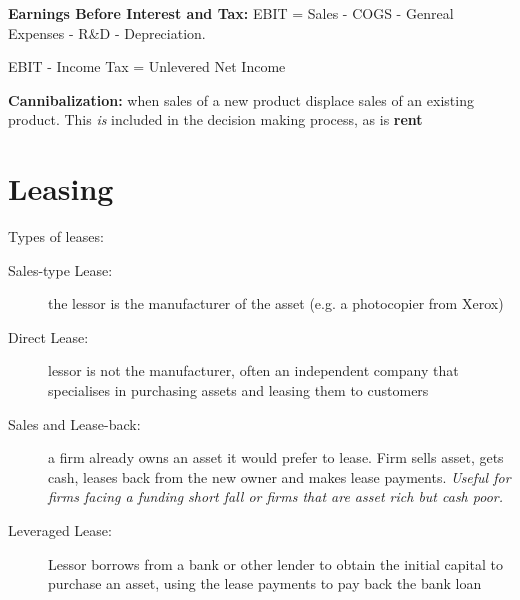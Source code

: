 \documentclass{report}
\begin{document}
\textbf{Earnings Before Interest and Tax:} EBIT = Sales - COGS - Genreal Expenses - R\&D - Depreciation.

EBIT - Income Tax = Unlevered Net Income

\textbf{Cannibalization:} when sales of a new product displace sales of an existing product. This \textit{is} included in the decision making process, as is \textbf{rent}\pagebreak

\section{Leasing}
\label{sec:leasing}

Types of leases:
\begin{description}
\item[Sales-type Lease:] the lessor is the manufacturer of the asset (e.g. a photocopier from Xerox)
\item[Direct Lease:] lessor is not the manufacturer, often an independent company that specialises in purchasing assets and leasing them to customers 
\item[Sales and Lease-back:] a firm already owns an asset it would prefer to lease. Firm sells asset, gets cash, leases back from the new owner and makes lease payments. \textit{Useful for firms facing a funding short fall or firms that are asset rich but cash poor.}
\item[Leveraged Lease:] Lessor borrows from a bank or other lender to obtain the initial capital to purchase an asset, using the lease payments to pay back the bank loan  
\end{description}
\end{document}
